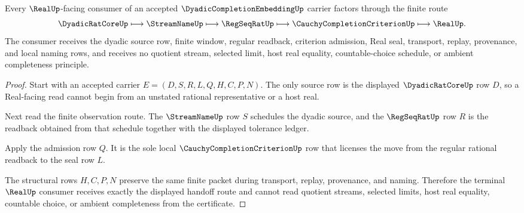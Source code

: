 \begin{theorem}
\label{thm:dyadic-completion-embedding-real-seal-handoff}
Every $\RealUp$-facing consumer of an accepted $\DyadicCompletionEmbeddingUp$ carrier factors through the finite route
$$
\DyadicRatCoreUp \longmapsto \StreamNameUp \longmapsto \RegSeqRatUp \longmapsto \CauchyCompletionCriterionUp \longmapsto \RealUp .
$$
The consumer receives the dyadic source row, finite window, regular readback, criterion admission, Real seal, transport, replay, provenance, and local naming rows, and receives no quotient stream, selected limit, host real equality, countable-choice schedule, or ambient completeness principle.
\end{theorem}
\begin{proof}
Start with an accepted carrier $E=(D,S,R,L,Q,H,C,P,N)$. The only source row is the displayed $\DyadicRatCoreUp$ row $D$, so a Real-facing read cannot begin from an unstated rational representative or a host real.

Next read the finite observation route. The $\StreamNameUp$ row $S$ schedules the dyadic source, and the $\RegSeqRatUp$ row $R$ is the readback obtained from that schedule together with the displayed tolerance ledger.

Apply the admission row $Q$. It is the sole local $\CauchyCompletionCriterionUp$ row that licenses the move from the regular rational readback to the seal row $L$.

The structural rows $H,C,P,N$ preserve the same finite packet during transport, replay, provenance, and naming. Therefore the terminal $\RealUp$ consumer receives exactly the displayed handoff route and cannot read quotient streams, selected limits, host real equality, countable choice, or ambient completeness from the certificate.
\end{proof}


